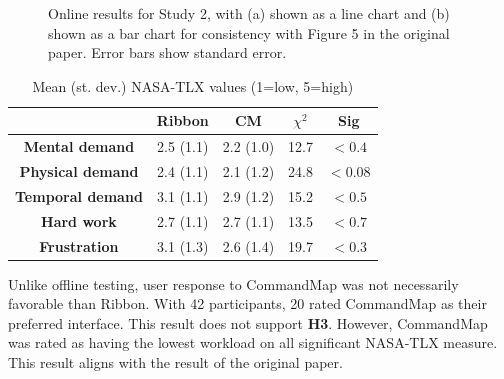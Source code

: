 \documentclass{article}
\begin{document}
\begin{figure}[tbh]
    \centering
    \caption{Online results for Study 2, with (a) shown as a line chart and (b) shown as a bar chart for consistency with Figure 5 in the original paper. Error bars show standard error.}
    \label{fig:result2}
\end{figure}

 \begin{table}[tbh]
  \centering
\begin{tabular}{c|c|c|c|c}
  &  \textbf{Ribbon}  &  \textbf{CM} &  \textbf{$\chi^2$} & \textbf{Sig}          \\\hline
 \textbf{Mental demand}&   2.5 (1.1)  & 2.2 (1.0)  & 12.7  & $<0.4$   \\ \hline
 \rowcolor{lightgray}
\textbf{Physical demand}  &    2.4 (1.1) &   2.1 (1.2) & 24.8  & $<0.08$  \\\hline       
\textbf{Temporal demand}  &    3.1 (1.1) &   2.9 (1.2) & 15.2  & $<0.5$  \\\hline      
 \rowcolor{lightgray}
\textbf{Hard work}  &    2.7 (1.1) &   2.7 (1.1) & 13.5  & $<0.7$   \\\hline   
\textbf{Frustration}  &    3.1 (1.3) &   2.6 (1.4) & 19.7  & $<0.3$ \\ \hline \hline
\end{tabular}
\caption{Mean (st. dev.) NASA-TLX values (1=low, 5=high)}
\label{fig:trial_log2}
\end{table}

Unlike offline testing, user response to CommandMap was not necessarily favorable than Ribbon. With 42 participants, 20 rated CommandMap as their preferred interface. This result does not support \textbf{H3}. However, CommandMap was rated as having the lowest workload on all significant NASA-TLX measure. This result aligns with the result of the original paper. 
\end{document}
